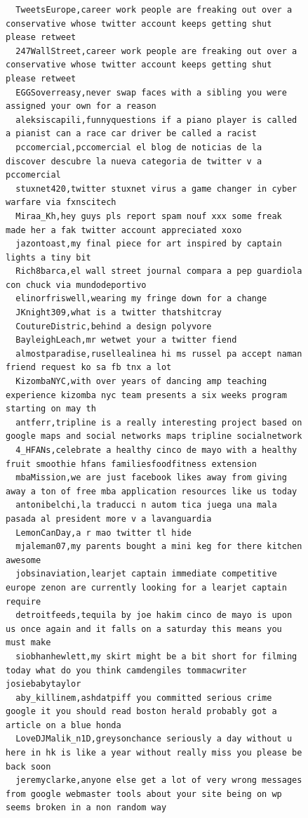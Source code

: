 \begin{figure}[htpb]
\begin{verbatim}
  TweetsEurope,career work people are freaking out over a conservative whose twitter account keeps getting shut please retweet
  247WallStreet,career work people are freaking out over a conservative whose twitter account keeps getting shut please retweet
  EGGSoverreasy,never swap faces with a sibling you were assigned your own for a reason
  aleksiscapili,funnyquestions if a piano player is called a pianist can a race car driver be called a racist
  pccomercial,pccomercial el blog de noticias de la discover descubre la nueva categoria de twitter v a pccomercial
  stuxnet420,twitter stuxnet virus a game changer in cyber warfare via fxnscitech
  Miraa_Kh,hey guys pls report spam nouf xxx some freak made her a fak twitter account appreciated xoxo
  jazontoast,my final piece for art inspired by captain lights a tiny bit
  Rich8barca,el wall street journal compara a pep guardiola con chuck via mundodeportivo
  elinorfriswell,wearing my fringe down for a change
  JKnight309,what is a twitter thatshitcray
  CoutureDistric,behind a design polyvore
  BayleighLeach,mr wetwet your a twitter fiend
  almostparadise,rusellealinea hi ms russel pa accept naman friend request ko sa fb tnx a lot
  KizombaNYC,with over years of dancing amp teaching experience kizomba nyc team presents a six weeks program starting on may th
  antferr,tripline is a really interesting project based on google maps and social networks maps tripline socialnetwork
  4_HFANs,celebrate a healthy cinco de mayo with a healthy fruit smoothie hfans familiesfoodfitness extension
  mbaMission,we are just facebook likes away from giving away a ton of free mba application resources like us today
  antonibelchi,la traducci n autom tica juega una mala pasada al president more v a lavanguardia
  LemonCanDay,a r mao twitter tl hide
  mjaleman07,my parents bought a mini keg for there kitchen awesome
  jobsinaviation,learjet captain immediate competitive europe zenon are currently looking for a learjet captain require
  detroitfeeds,tequila by joe hakim cinco de mayo is upon us once again and it falls on a saturday this means you must make
  siobhanhewlett,my skirt might be a bit short for filming today what do you think camdengiles tommacwriter josiebabytaylor
  aby_killinem,ashdatpiff you committed serious crime google it you should read boston herald probably got a article on a blue honda
  LoveDJMalik_n1D,greysonchance seriously a day without u here in hk is like a year without really miss you please be back soon
  jeremyclarke,anyone else get a lot of very wrong messages from google webmaster tools about your site being on wp seems broken in a non random way

\end{verbatim}
\end{figure}
